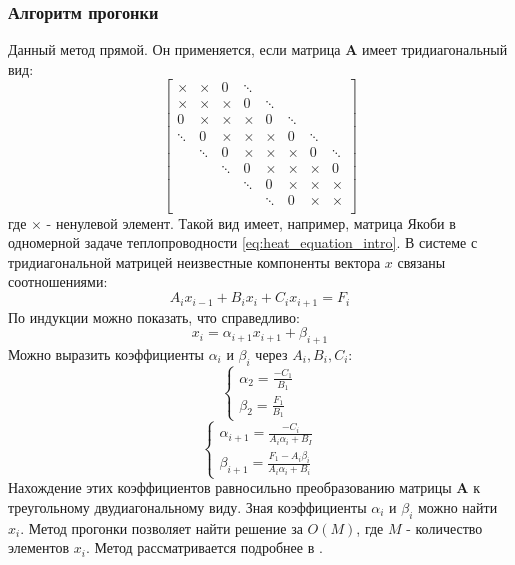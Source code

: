 \subsubsection{Алгоритм прогонки \label{methods:tridiagonal}}
Данный метод прямой. Он применяется, если матрица $\mathbf{A}$ имеет тридиагональный вид:
\begin{equation} \label{mat:tridiagonal}
\left[
\begin{array}{ccccccccc}
\times & \times & 0 & \ddots \\
\times & \times  & \times & 0 & \ddots \\
0 & \times & \times & \times & 0 & \ddots \\
\ddots & 0 & \times & \times & \times & 0 & \ddots \\
& \ddots & 0 & \times & \times & \times & 0 & \ddots \\
&& \ddots & 0 & \times & \times & \times & 0 \\
&&& \ddots & 0 & \times & \times & \times \\
&&&& \ddots & 0 & \times & \times\\
\end{array}
\right]
\end{equation}
где $\times$ - ненулевой элемент.
Такой вид имеет, например, матрица Якоби в одномерной задаче теплопроводности \eqref{eq:heat_equation_intro}.
В системе с тридиагональной матрицей неизвестные компоненты вектора $x$ связаны соотношениями:
\begin{equation}
A_i x_{i-1} + B_i x_i + C_i x_{i+1} = F_i
\end{equation}
По индукции можно показать, что справедливо:
\begin{equation}
x_i = \alpha_{i+1} x_{i+1} + \beta_{i+1}
\end{equation}
Можно выразить коэффициенты $\alpha_i$ и $\beta_i$ через $A_i, B_i, C_i$:
\begin{equation}
\begin{cases}
\alpha_2 = \frac{-C_1}{B_1} \\
\beta_2 = \frac{F_1}{B_1}
\end{cases}
\end{equation}
\begin{equation}
\begin{cases}
\alpha_{i+1} = \frac{-C_i}{A_i \alpha_i + B_I} \\
\beta_{i+1} = \frac{F_1 - A_i \beta_i}{A_i \alpha_i + B_i}
\end{cases}
\end{equation}
Нахождение этих коэффициентов равносильно преобразованию матрицы $\mathbf{A}$ к треугольному двудиагональному виду. Зная коэффициенты $\alpha_i$ и $\beta_i$ можно найти $x_i$. Метод прогонки позволяет найти решение за $O(M)$, где $M$ - количество элементов $x_i$. Метод рассматривается подробнее в \cite{Petrov}.

